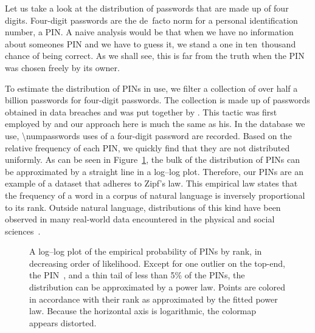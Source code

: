 \begin{example}
\label{ex:pin}%
  Let us take a look at the distribution of passwords that are made up of four digits.
  Four-digit passwords are the de~facto norm for a personal identification number, a PIN.
  A naive analysis would be that when we have no information about someones PIN and we have to guess it, we stand a one in ten~thousand chance of being correct.
  As we shall see, this is far from the truth when the PIN was chosen freely by its owner.

  To estimate the distribution of PINs in use, we filter a collection of over half a billion passwords for four-digit passwords.
  The collection is made up of passwords obtained in data breaches and was put together by \textcite{hunt2018have}.
  This tactic was first employed by \textcite{berry2012pin} and our approach here is much the same as his.
  In the database we use, \num{\numpasswords} uses of a four-digit password are recorded.
  Based on the relative frequency of each PIN, we quickly find that they are not distributed uniformly.
  As can be seen in Figure~\ref{fig:pinprobability}, the bulk of the distribution of PINs can be approximated by a straight line in a log--log plot.
  Therefore, our PINs are an example of a dataset that adheres to Zipf's law.
  This empirical law states that the frequency of a word in a corpus of natural language is inversely proportional to its rank.
  Outside natural language, distributions of this kind have been observed in many real-world data encountered in the physical and social sciences~\parencite{newman2005power}.
  \begin{figure}
    \centering
    \caption{
      A log--log plot of the empirical probability of PINs by rank, in decreasing order of likelihood.
      Except for one outlier on the top-end, the PIN~, and a thin tail of less than 5\% of the PINs, the distribution can be approximated by a power law.
      Points are colored in accordance with their rank as approximated by the fitted power law.
      Because the horizontal axis is logarithmic, the colormap appears distorted.
    }
    \label{fig:pinprobability}
  \end{figure}


\end{example}
